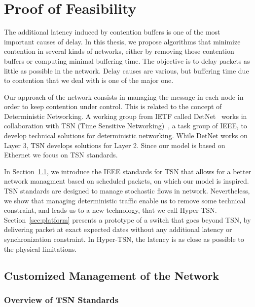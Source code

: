
\chapter{Proof of Feasibility}
\label{chap:TSN}
\minitoc

The additional latency induced by contention buffers is one of the most important causes of delay.
In this thesis, we propose algorithms that minimize contention in several kinds of networks, either by removing those contention buffers or computing minimal buffering time. The objective is to delay packets as little as possible in the network. Delay causes are various, but buffering time due to contention that we deal with is one of the major one. 

Our approach of the network consists in managing the message in each node in order to keep contention under control. This is related to the concept of Deterministic Networking. A working group from IETF called DetNet~\cite{finn-detnet-architecture-08} works in collaboration with TSN (Time Sensitive Networking)~\cite{ieee802}, a task group of IEEE, to develop technical solutions for deterministic networking. While DetNet works on Layer 3, TSN develops solutions for Layer 2. Since our model is based on Ethernet we focus on TSN standards.

In Section~\ref{sec:TSNqbv}, we introduce the IEEE standards for TSN that allows for a better network managment based on scheduled packets, on which our model is inspired. TSN standards are designed to manage stochastic flows in network. Nevertheless, we show that managing deterministic traffic enable us to remove some technical constraint, and leads us to a new technology, that we call Hyper-TSN. Section~\ref{sec:platform} presents a prototype of a switch that goes beyond TSN, by delivering packet at exact expected dates without any additional latency or synchronization constraint. In Hyper-TSN, the latency is as close as possible to the physical limitations.


\section{Customized Management of the Network}
\label{sec:TSNqbv}

\subsection{Overview of TSN Standards}

